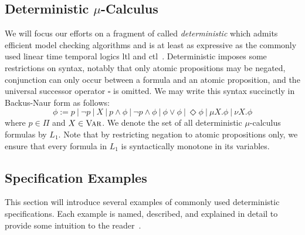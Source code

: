 
\subsection{\texorpdfstring{Deterministic $\mu$-Calculus}{Deterministic mu-Calculus}}\label{prelims:deterministic_mucalc}

We will focus our efforts on a fragment of \mucalc{} called {\em deterministic\/\mucalc{}\/} which admits efficient model checking algorithms and is at least as expressive as the commonly used linear time temporal logics \gls{ltl} and \gls{ctl}~\cite{Karaman2009}. Deterministic \mucalc{} imposes some restrictions on syntax, notably that only atomic propositions may be negated, conjunction can only occur between a formula and an atomic proposition, and the universal successor operator $\square$ is omitted. We may write this syntax succinctly in Backus-Naur form as follows:
\[ 
\phi := p \ | \ \lnot p \ | \ X \ | \ p \land \phi \ | \ \lnot p \land \phi \ | \ \phi \lor \phi \ | \ \Diamond \phi \ | \ \mu X.\phi \ | \ \nu X. \phi
\]
where $p \in \Pi$ and $X \in \textsc{Var}$. We denote the set of all deterministic $\mu$-calculus formulas by $L_1$. Note that by restricting negation to atomic propositions only, we ensure that every formula in $L_1$ is syntactically monotone in its variables.






\subsection{Specification Examples}\label{prelims:spec_examples}

This section will introduce several examples of commonly used deterministic \mucalc{} specifications. Each example is named, described, and explained in detail to provide some intuition to the reader~\cite{Karaman2009}.

